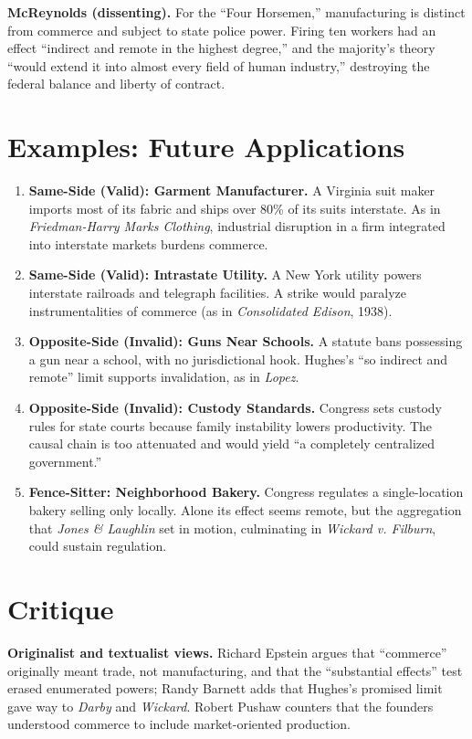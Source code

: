 \documentclass[12pt]{article}
\begin{document}
\textbf{McReynolds (dissenting).} For the ``Four Horsemen,'' manufacturing is distinct from commerce and subject to state police power. Firing ten workers had an effect ``indirect and remote in the highest degree,'' and the majority's theory ``would extend it into almost every field of human industry,'' destroying the federal balance and liberty of contract.

\section{Examples: Future Applications}

\begin{enumerate}
\item \textbf{Same-Side (Valid): Garment Manufacturer.} A Virginia suit maker imports most of its fabric and ships over 80\% of its suits interstate. As in \textit{Friedman-Harry Marks Clothing}, industrial disruption in a firm integrated into interstate markets burdens commerce.
\item \textbf{Same-Side (Valid): Intrastate Utility.} A New York utility powers interstate railroads and telegraph facilities. A strike would paralyze instrumentalities of commerce (as in \textit{Consolidated Edison}, 1938).
\item \textbf{Opposite-Side (Invalid): Guns Near Schools.} A statute bans possessing a gun near a school, with no jurisdictional hook. Hughes's ``so indirect and remote'' limit supports invalidation, as in \textit{Lopez}.
\item \textbf{Opposite-Side (Invalid): Custody Standards.} Congress sets custody rules for state courts because family instability lowers productivity. The causal chain is too attenuated and would yield ``a completely centralized government.''
\item \textbf{Fence-Sitter: Neighborhood Bakery.} Congress regulates a single-location bakery selling only locally. Alone its effect seems remote, but the aggregation that \textit{Jones \& Laughlin} set in motion, culminating in \textit{Wickard v. Filburn}, could sustain regulation.
\end{enumerate}

\section{Critique}

\textbf{Originalist and textualist views.} Richard Epstein argues that ``commerce'' originally meant trade, not manufacturing, and that the ``substantial effects'' test erased enumerated powers; Randy Barnett adds that Hughes's promised limit gave way to \textit{Darby} and \textit{Wickard}. Robert Pushaw counters that the founders understood commerce to include market-oriented production.
\end{document}
